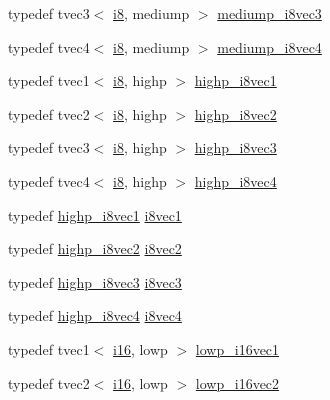 \begin{DoxyCompactItemize}
\item 
typedef tvec3$<$ \hyperlink{group__gtc__type__precision_gaae064be68b7d36cd7910c16e8ad18bba}{i8}, mediump $>$ \hyperlink{namespaceglm_aeb9f1d74a3e4109e6630b86cbee32b06}{mediump\+\_\+i8vec3}
\item 
typedef tvec4$<$ \hyperlink{group__gtc__type__precision_gaae064be68b7d36cd7910c16e8ad18bba}{i8}, mediump $>$ \hyperlink{namespaceglm_a6b7949e7eb8b968b391876925d65f07c}{mediump\+\_\+i8vec4}
\item 
typedef tvec1$<$ \hyperlink{group__gtc__type__precision_gaae064be68b7d36cd7910c16e8ad18bba}{i8}, highp $>$ \hyperlink{namespaceglm_a854b15e7f4a403edea8cc8ec7e909c93}{highp\+\_\+i8vec1}
\item 
typedef tvec2$<$ \hyperlink{group__gtc__type__precision_gaae064be68b7d36cd7910c16e8ad18bba}{i8}, highp $>$ \hyperlink{namespaceglm_a4f10fdcaf6ec5d8229800fb4f089437a}{highp\+\_\+i8vec2}
\item 
typedef tvec3$<$ \hyperlink{group__gtc__type__precision_gaae064be68b7d36cd7910c16e8ad18bba}{i8}, highp $>$ \hyperlink{namespaceglm_a3261320a0a8cc8852e28f42bb6c02f18}{highp\+\_\+i8vec3}
\item 
typedef tvec4$<$ \hyperlink{group__gtc__type__precision_gaae064be68b7d36cd7910c16e8ad18bba}{i8}, highp $>$ \hyperlink{namespaceglm_a4bc8c9d417824225c6abbcbf3eb146c5}{highp\+\_\+i8vec4}
\item 
typedef \hyperlink{namespaceglm_a854b15e7f4a403edea8cc8ec7e909c93}{highp\+\_\+i8vec1} \hyperlink{group__gtc__type__precision_ga1cb1ef0f2a9266aba88f161c9062cebc}{i8vec1}
\item 
typedef \hyperlink{namespaceglm_a4f10fdcaf6ec5d8229800fb4f089437a}{highp\+\_\+i8vec2} \hyperlink{group__gtc__type__precision_ga277312370b6155b37dbf2a6954c42915}{i8vec2}
\item 
typedef \hyperlink{namespaceglm_a3261320a0a8cc8852e28f42bb6c02f18}{highp\+\_\+i8vec3} \hyperlink{group__gtc__type__precision_ga97a6cae79db311cdd47c4e88a5855987}{i8vec3}
\item 
typedef \hyperlink{namespaceglm_a4bc8c9d417824225c6abbcbf3eb146c5}{highp\+\_\+i8vec4} \hyperlink{group__gtc__type__precision_gafbf10a778016eba57d44beb585f2dc49}{i8vec4}
\item 
typedef tvec1$<$ \hyperlink{group__gtc__type__precision_ga35e5542ca05b29cc256fdafb8503d1fd}{i16}, lowp $>$ \hyperlink{namespaceglm_a30a0933d1522614046808478a3bc2047}{lowp\+\_\+i16vec1}
\item 
typedef tvec2$<$ \hyperlink{group__gtc__type__precision_ga35e5542ca05b29cc256fdafb8503d1fd}{i16}, lowp $>$ \hyperlink{namespaceglm_aaa886fe5fe83a35f45959eb90f73ba17}{lowp\+\_\+i16vec2}

\end{DoxyCompactItemize}

